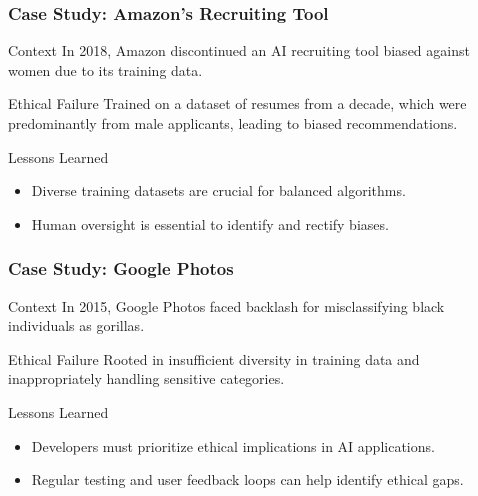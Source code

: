\documentclass[aspectratio=169]{beamer}
\begin{document}
\begin{frame}[fragile]
    \frametitle{Case Study: Amazon’s Recruiting Tool}
    \begin{block}{Context}
        In 2018, Amazon discontinued an AI recruiting tool biased against women due to its training data.
    \end{block}
    
    \begin{block}{Ethical Failure}
        Trained on a dataset of resumes from a decade, which were predominantly from male applicants, leading to biased recommendations.
    \end{block}

    \begin{block}{Lessons Learned}
        \begin{itemize}
            \item Diverse training datasets are crucial for balanced algorithms.
            \item Human oversight is essential to identify and rectify biases.
        \end{itemize}
    \end{block}
\end{frame}

\begin{frame}[fragile]
    \frametitle{Case Study: Google Photos}
    \begin{block}{Context}
        In 2015, Google Photos faced backlash for misclassifying black individuals as gorillas.
    \end{block}
    
    \begin{block}{Ethical Failure}
        Rooted in insufficient diversity in training data and inappropriately handling sensitive categories.
    \end{block}

    \begin{block}{Lessons Learned}
        \begin{itemize}
            \item Developers must prioritize ethical implications in AI applications.
            \item Regular testing and user feedback loops can help identify ethical gaps.
        \end{itemize}
    \end{block}
\end{frame}
\end{document}
